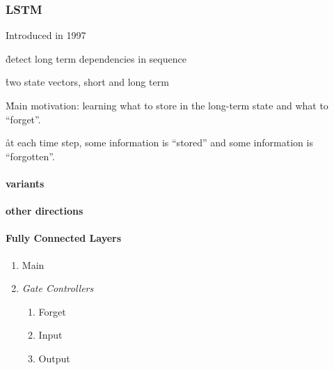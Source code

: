 \subsubsection{LSTM}


Introduced in 1997 %

\r{detect long term dependencies in sequence}

\r{two state vectors, short and long term}

\r{Main motivation: learning what to store in the long-term state and what to ``forget''.}

\r{at each time step, some information is ``stored'' and some information is ``forgotten''.}

\paragraph{variants}





\paragraph{other directions}


\paragraph{Fully Connected Layers}


\begin{enumerate}[noitemsep,topsep=0pt]
	\item Main
	\item \textit{Gate Controllers}
	\begin{enumerate}[noitemsep,topsep=0pt]
		\item Forget
		\item Input
		\item Output
	\end{enumerate}
\end{enumerate}

